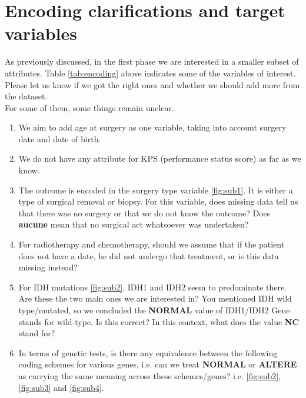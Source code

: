 \documentclass[a4paper]{article}
\begin{document}
\section{Encoding clarifications and target variables}
As previously discussed, in the first phase we are interested in a smaller subset of attributes. Table \ref{tab:encoding} above indicates some of the variables of interest. Please let us know if we got the right ones and whether we should add more from the dataset. \\
For some of them, some things remain unclear. \\
\begin{enumerate}
\item We aim to add age at surgery as one variable, taking into account surgery date and date of birth. 
\item We do not have any attribute for KPS (performance status score) as far as we know. 
\item The outcome is encoded in the surgery type variable \ref{fig:sub1}. It is either a type of surgical removal or biopsy. For this variable, does missing data tell us that there was no surgery or that we do not know the outcome?
Does \textbf{aucune} mean that no surgical act whatsoever was undertaken?
\item For radiotherapy and chemotherapy, should we assume that if the patient does not have a date, he did not undergo that treatment, or is this data missing instead? 
\item For IDH mutations \ref{fig:sub2}, IDH1 and IDH2 seem to predominate there. Are these the two main ones we are interested in? You mentioned IDH wild type/mutated, so we concluded the \textbf{NORMAL} value of IDH1/IDH2 Gene stands for wild-type. Is this correct? In this context, what does the value \textbf{NC} stand for?
\item In terms of genetic tests, is there any equivalence between the following coding schemes for various genes, i.e. can we treat \textbf{NORMAL} or \textbf{ALTERE} as carrying the same meaning across these schemes/genes? i.e. \ref{fig:sub2}, \ref{fig:sub3} and \ref{fig:sub4}.
\end{enumerate}
\end{document}
